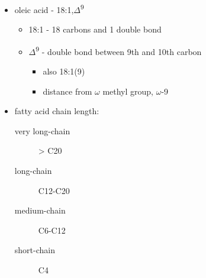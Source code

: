 \documentclass[12pt]{scrartcl}
\begin{document}
\begin{center}
\end{center}
\begin{itemize}
\item oleic acid - 18:1,\(\Delta\)\textsuperscript{9}
\begin{itemize}
\item 18:1 - 18 carbons and 1 double bond
\item \(\Delta\)\textsuperscript{9} - double bond between 9th and 10th carbon
\begin{itemize}
\item also 18:1(9)
\item distance from \(\omega\) methyl group, \(\omega\)-9
\end{itemize}
\end{itemize}

\item fatty acid chain length:
\begin{description}
\item[{very long-chain}] > C20
\item[{long-chain}] C12-C20
\item[{medium-chain}] C6-C12
\item[{short-chain}] C4
\end{description}
\end{itemize}
\end{document}
